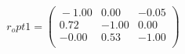 \documentclass[10pt,a4paper]{article}
\begin{document}
 \begin{equation*} r_opt1  =  %
\begin{pmatrix}{}
  -1.00 & 0.00 & -0.05 \\ 
  0.72 & -1.00 & 0.00 \\ 
  -0.00 & 0.53 & -1.00 \\ 
  \end{pmatrix}
 \end{equation*} 
\end{document}
